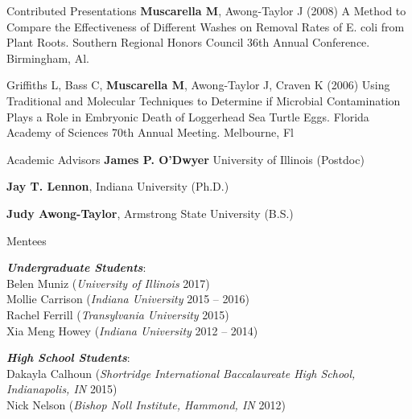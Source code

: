 \documentclass{resume} %
\begin{document}
\begin{rSection}{Contributed Presentations}
  {\bf Muscarella M}, Awong-Taylor J (2008) A Method to Compare the
  Effectiveness of Different Washes on Removal Rates of E. coli from Plant
  Roots. Southern Regional Honors Council 36th Annual Conference. Birmingham,
  Al.

  Griffiths L, Bass  C, {\bf Muscarella M}, Awong-Taylor J, Craven K (2006)
  Using Traditional and Molecular Techniques to Determine if Microbial
  Contamination Plays a Role in Embryonic Death of Loggerhead Sea Turtle Eggs.
  Florida Academy of Sciences 70th Annual Meeting. Melbourne, Fl

\end{rSection}



\begin{rSection}{Academic Advisors}
  {\bf James P. O'Dwyer} University of Illinois (Postdoc)

  {\bf Jay T. Lennon}, Indiana University (Ph.D.)

  {\bf Judy Awong-Taylor}, Armstrong State University (B.S.)

\end{rSection}


\begin{rSection}{Mentees}

  {\bf \em Undergraduate Students}: \\
    Belen Muniz ({\em University of Illinois} 2017)\\
    Mollie Carrison ({\em Indiana University} 2015 -- 2016)\\
    Rachel Ferrill ({\em Transylvania University} 2015) \\
    Xia Meng Howey ({\em Indiana University} 2012 -- 2014)

  {\bf \em High School Students}: \\
    Dakayla Calhoun ({\em Shortridge International Baccalaureate High
    School, Indianapolis, IN} 2015)\\
    Nick Nelson ({\em Bishop Noll Institute, Hammond, IN} 2012)

\end{rSection}
\end{document}
